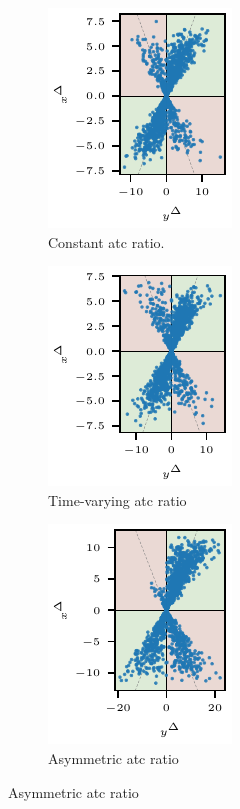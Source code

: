 \documentclass[pdflatex]{sn-jnl}
\theoremstyle{plain}%
\theoremstyle{definition}
\begin{document}
\begin{figure}
    \centering
    \begin{subfigure}{0.24\textwidth}
        \includegraphics{plots/illustrative_examples/appendix_4q_dgp1}
        \caption{Constant \ac{atc} ratio.}
    \end{subfigure}\hspace{0.01\textwidth}
    \begin{subfigure}{0.24\textwidth}
        \includegraphics{plots/illustrative_examples/appendix_4q_dgp1_time}
        \caption{Time-varying \ac{atc} ratio}
    \end{subfigure}\hspace{0.01\textwidth}
    \begin{subfigure}{0.24\textwidth}
        \includegraphics{plots/illustrative_examples/appendix_4q_dgp1_asym}
        \caption{Asymmetric \ac{atc} ratio}

\end{subfigure}
\end{figure}
\end{document}
